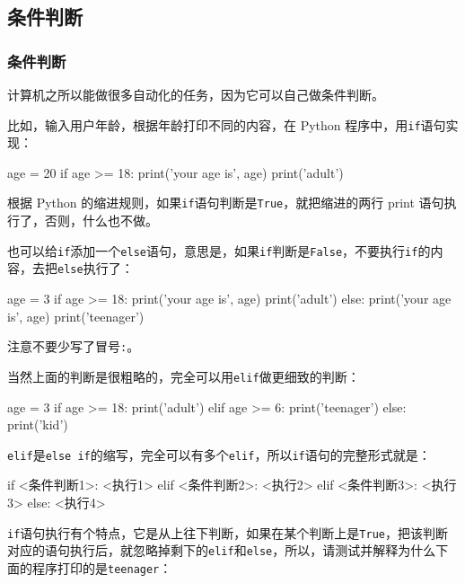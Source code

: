 \hypertarget{ux6761ux4ef6ux5224ux65ad}{%
\subsection{条件判断}\label{ux6761ux4ef6ux5224ux65ad}}

\hypertarget{ux6761ux4ef6ux5224ux65ad-1}{%
\subsubsection{条件判断}\label{ux6761ux4ef6ux5224ux65ad-1}}

计算机之所以能做很多自动化的任务，因为它可以自己做条件判断。

比如，输入用户年龄，根据年龄打印不同的内容，在 Python
程序中，用\texttt{if}语句实现：

\begin{pythoncode}
age = 20
if age >= 18:
    print('your age is', age)
    print('adult')
\end{pythoncode}

根据 Python
的缩进规则，如果\texttt{if}语句判断是\texttt{True}，就把缩进的两行 print
语句执行了，否则，什么也不做。

也可以给\texttt{if}添加一个\texttt{else}语句，意思是，如果\texttt{if}判断是\texttt{False}，不要执行\texttt{if}的内容，去把\texttt{else}执行了：

\begin{pythoncode}
age = 3
if age >= 18:
    print('your age is', age)
    print('adult')
else:
    print('your age is', age)
    print('teenager')
\end{pythoncode}

注意不要少写了冒号\texttt{:}。

当然上面的判断是很粗略的，完全可以用\texttt{elif}做更细致的判断：

\begin{pythoncode}
age = 3
if age >= 18:
    print('adult')
elif age >= 6:
    print('teenager')
else:
    print('kid')
\end{pythoncode}

\texttt{elif}是\texttt{else\ if}的缩写，完全可以有多个\texttt{elif}，所以\texttt{if}语句的完整形式就是：

\begin{pythoncode}
if <条件判断1>:
    <执行1>
elif <条件判断2>:
    <执行2>
elif <条件判断3>:
    <执行3>
else:
    <执行4>
\end{pythoncode}

\texttt{if}语句执行有个特点，它是从上往下判断，如果在某个判断上是\texttt{True}，把该判断对应的语句执行后，就忽略掉剩下的\texttt{elif}和\texttt{else}，所以，请测试并解释为什么下面的程序打印的是\texttt{teenager}：

